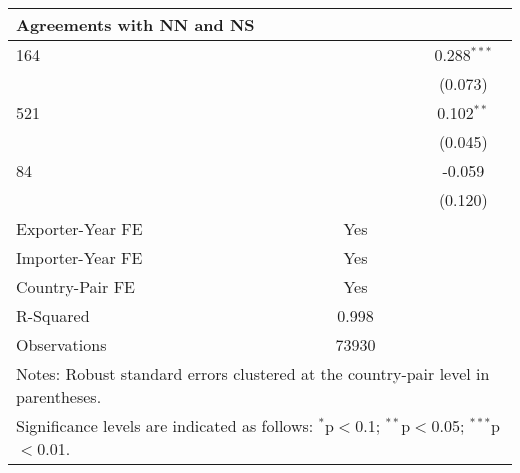 \begin{table}[htbp]
\begin{adjustbox}{max width=\textwidth}
\begin{tabular}{lccc}
    \hline
    \textbf{Agreements with NN and NS} &  &  &  \\
    \hline
    164 &  &  & 0.288$^{\ast\ast\ast}$ \\
    &  &  & (0.073) \\
    521 &  &  & 0.102$^{\ast\ast}$ \\
    &  &  & (0.045) \\
    84  &  &  & -0.059 \\
    &  &  & (0.120) \\
    \hline
    Exporter-Year FE & Yes \\
    Importer-Year FE & Yes \\
    Country-Pair FE & Yes \\
    R-Squared & 0.998 \\
    Observations & 73930 \\
    \hline
    \multicolumn{4}{l}{\footnotesize{Notes: Robust standard errors clustered at the country-pair level in parentheses.}} \\
    \multicolumn{4}{l}{\footnotesize{Significance levels are indicated as follows: $^{\ast}$p$<$0.1; $^{\ast\ast}$p$<$0.05; $^{\ast\ast\ast}$p$<$0.01.}} \\
    \end{tabular}
    \end{adjustbox}
\end{table}
